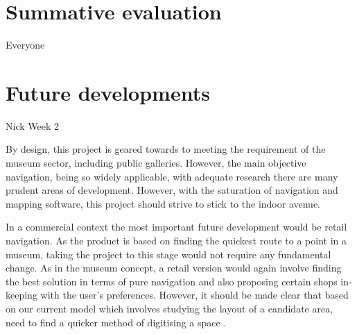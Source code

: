 \section{Summative evaluation}
Everyone

\section{Future developments}
Nick Week 2

By design, this project is geared towards to meeting the requirement of the museum sector, including public galleries. However, the main objective navigation, being so widely applicable, with adequate research there are many prudent areas of development. However, with the saturation of navigation and mapping software, this project should strive to stick to the indoor avenue. 

In a commercial context the most important future development would be retail navigation. As the product is based on finding the quickest route to a point in a museum, taking the project to this stage would not require any fundamental change. As in the museum concept, a retail version would again involve finding the best solution in terms of pure navigation and also proposing certain shops in-keeping with the user’s preferences. However, it should be made clear that based on our current model which involves  studying the layout of a candidate area,  need to find a quicker method of digitising a space . 

